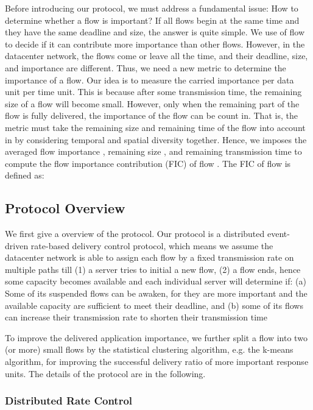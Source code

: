 \documentclass[conference]{IEEEtran}
\begin{document}
Before introducing our protocol, we must address a fundamental issue: How to determine whether a flow is important? If all flows begin at the same time and they have the same deadline and size, the answer is quite simple. We use  of flow to decide if it can contribute more importance than other flows. However, in the datacenter network, the flows come or leave all the time, and their deadline, size, and importance are different. Thus, we need a new metric to determine the importance of a flow.
Our idea is to measure the carried importance per data unit per time unit. This is because after some transmission time, the remaining size of a flow will become small. However, only when the remaining part of the flow is fully delivered, the importance of the flow can be count in. That is, the metric must take the remaining size and remaining time of the flow into account in by considering temporal and spatial diversity together. Hence, we imposes the averaged flow importance , remaining size , and remaining transmission time  to compute the flow importance contribution (FIC) of flow . The FIC of flow  is defined as:



\subsection{Protocol Overview}

We first give a overview of the protocol. Our protocol is a distributed event-driven rate-based delivery control protocol, which means we assume the datacenter network is able to assign each flow by a fixed transmission rate on multiple paths till (1) a server tries to initial a new flow, (2) a flow ends, hence some capacity becomes available and each individual server will determine if: (a) Some of its suspended flows can be awaken, for they are more important and the available capacity are sufficient to meet their deadline, and (b) some of its flows can increase their transmission rate to shorten their transmission time



To improve the delivered application importance, we further split a flow into two (or more) small flows by the statistical clustering algorithm, e.g. the k-means algorithm, for improving the successful delivery ratio of more important response units. The details of the protocol are in the following.

\subsubsection{Distributed Rate Control}
\end{document}
